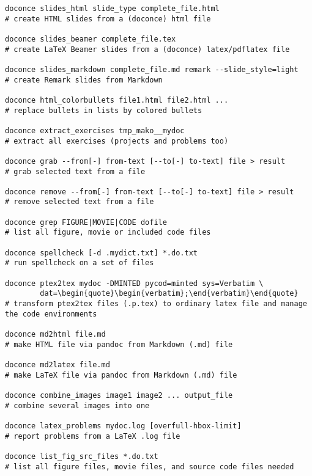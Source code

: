 \documentclass[%
oneside,                 %
final,                   %
10pt]{article}
\newcounter{doconce:movie:counter}
\begin{document}
\begin{Verbatim}[numbers=none,fontsize=\fontsize{9pt}{9pt},baselinestretch=0.95,xleftmargin=2mm]
doconce slides_html slide_type complete_file.html                      
# create HTML slides from a (doconce) html file

doconce slides_beamer complete_file.tex                                
# create LaTeX Beamer slides from a (doconce) latex/pdflatex file

doconce slides_markdown complete_file.md remark --slide_style=light    
# create Remark slides from Markdown

doconce html_colorbullets file1.html file2.html ...                    
# replace bullets in lists by colored bullets

doconce extract_exercises tmp_mako__mydoc                              
# extract all exercises (projects and problems too)

doconce grab --from[-] from-text [--to[-] to-text] file > result       
# grab selected text from a file

doconce remove --from[-] from-text [--to[-] to-text] file > result     
# remove selected text from a file

doconce grep FIGURE|MOVIE|CODE dofile                                  
# list all figure, movie or included code files

doconce spellcheck [-d .mydict.txt] *.do.txt                           
# run spellcheck on a set of files

doconce ptex2tex mydoc -DMINTED pycod=minted sys=Verbatim \
        dat=\begin{quote}\begin{verbatim};\end{verbatim}\end{quote} 
# transform ptex2tex files (.p.tex) to ordinary latex file and manage the code environments

doconce md2html file.md                                                
# make HTML file via pandoc from Markdown (.md) file

doconce md2latex file.md                                               
# make LaTeX file via pandoc from Markdown (.md) file

doconce combine_images image1 image2 ... output_file                   
# combine several images into one

doconce latex_problems mydoc.log [overfull-hbox-limit]                 
# report problems from a LaTeX .log file

doconce list_fig_src_files *.do.txt                                    
# list all figure files, movie files, and source code files needed


\end{Verbatim}
\end{document}

